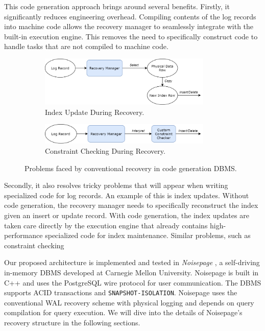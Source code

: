\documentclass[12pt]{cmuthesis}
\begin{document}
This code generation approach brings around several benefits. Firstly, it significantly reduces engineering overhead. Compiling contents of the log records into machine code allows the recovery manager to seamlessly integrate with the built-in execution engine. This removes the need to specifically construct code to handle tasks that are not compiled to machine code.

\begin{figure}[H]
\centering
\begin{subfigure}{.5\textwidth}
 \centering
 \includegraphics[width=0.9\textwidth]{images/RecoverIndex.png}
 \caption{Index Update During Recovery.}
  \label{fig:pipeline_graph}
\end{subfigure}%
\begin{subfigure}{.5\textwidth}
 \centering
 \includegraphics[width=0.9\textwidth]{images/RecoverConstraint.png}
 \caption{Constraint Checking During Recovery.}
  \label{fig:pipeline_code}
\end{subfigure}
\caption{Problems faced by conventional recovery in code generation DBMS.}
\label{fig:log_record}
\end{figure}

Secondly, it also resolves tricky problems that will appear when writing specialized code for log records. An example of this is index updates. Without code generation, the recovery manager needs to specifically reconstruct the index given an insert or update record. With code generation, the index updates are taken care directly by the execution engine that already contains high-performance specialized code for index maintenance. Similar problems, such as constraint checking

Our proposed architecture is implemented and tested in \textit{Noisepage} \cite{noisepage}, a self-driving in-memory DBMS developed at Carnegie Mellon University. Noisepage is built in C++ and uses the PostgreSQL wire protocol for user communication. The DBMS supports ACID transactions and \texttt{SNAPSHOT-ISOLATION}. Noisepage uses the conventional WAL recovery scheme with physical logging and depends on query compilation for query execution. We will dive into the details of Noisepage's recovery structure in the following sections.
\end{document}
